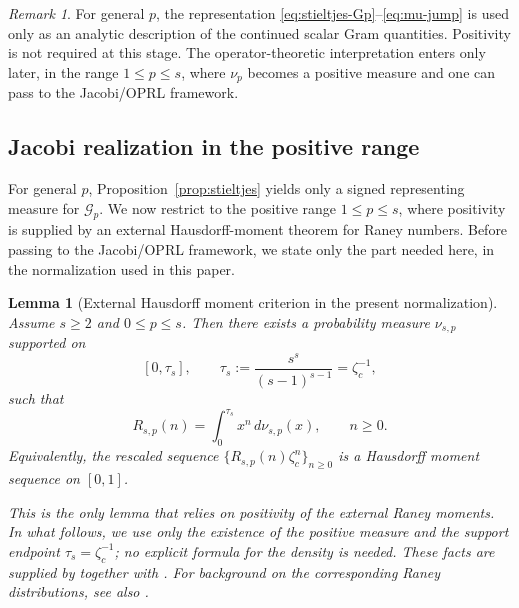 \documentclass[11pt]{amsart}
\numberwithin{equation}{section}
\theoremstyle{plain}
\newtheorem{lemma}[theorem]{Lemma}
\theoremstyle{definition}
\theoremstyle{remark}
\newtheorem{remark}[theorem]{Remark}
\begin{document}
\begin{remark}
	\label{rem:stieltjes-general}
	For general \(p\), the representation
	\eqref{eq:stieltjes-Gp}--\eqref{eq:mu-jump} is used only as an analytic
	description of the continued scalar Gram quantities. Positivity is not required at
	this stage. The operator-theoretic interpretation enters only later, in the
	range \(1\le p\le s\), where \(\nu_p\) becomes a positive measure and one can
	pass to the Jacobi/OPRL framework.
\end{remark}

\subsection{Jacobi realization in the positive range}
\label{subsec:jacobi}

For general \(p\), Proposition~\ref{prop:stieltjes} yields only a signed
representing measure for \(\mathcal G_p\). We now restrict to the positive
range \(1\le p\le s\), where positivity is supplied by an external
Hausdorff-moment theorem for Raney numbers. Before passing to the Jacobi/OPRL framework, we state only the part needed here, in the normalization used in this paper.

\begin{lemma}[External Hausdorff moment criterion in the present normalization]
	\label{lem:raney-moment-input}
	Assume \(s\ge2\) and \(0\le p\le s\). Then there exists a probability
	measure \(\nu_{s,p}\) supported on
	\[
		[0,\tau_s],
		\qquad
		\tau_s:=\frac{s^s}{(s-1)^{s-1}}=\zeta_c^{-1},
	\]
	such that
	\[
		R_{s,p}(n)=\int_0^{\tau_s} x^n\,d\nu_{s,p}(x),
		\qquad n\ge0.
	\]
	Equivalently, the rescaled sequence
	\(\{R_{s,p}(n)\zeta_c^n\}_{n\ge0}\) is a Hausdorff moment sequence on
	\([0,1]\).

	This is the only lemma that relies on positivity of the external Raney moments. In what follows, we use only the existence of the positive
	measure and the support endpoint \(\tau_s=\zeta_c^{-1}\); no explicit
	formula for the density is needed. These facts are supplied by
	\cite[Thm.~5]{LiuPego2016} together with
	\cite{LiuPegoCorrigendum2026}. For background on the corresponding Raney
	distributions, see also \cite{ForresterLiu2015}.
\end{lemma}
\end{document}
